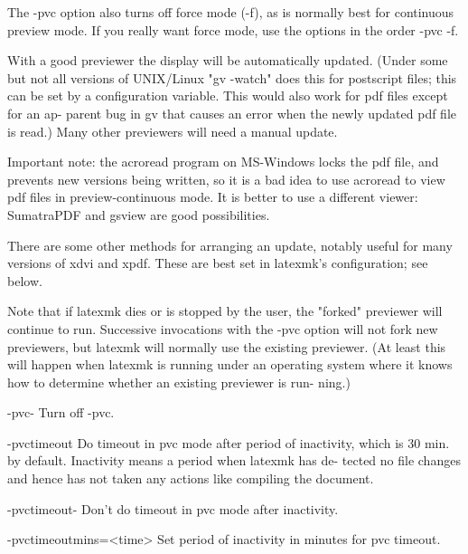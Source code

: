               The -pvc option also turns off force mode (-f), as  is  normally
              best  for  continuous  preview  mode.   If you really want force
              mode, use the options in the order -pvc -f.

              With a good previewer the display will be automatically updated.
              (Under  some but not all versions of UNIX/Linux "gv -watch" does
              this for postscript files; this can be set  by  a  configuration
              variable.   This would also work for pdf files except for an ap-
              parent bug in gv that causes an error when the newly updated pdf
              file is read.)  Many other previewers will need a manual update.

              Important note: the acroread program on MS-Windows locks the pdf
              file, and prevents new versions being written, so it  is  a  bad
              idea  to  use  acroread  to view pdf files in preview-continuous
              mode.  It is better to use a different  viewer:  SumatraPDF  and
              gsview are good possibilities.

              There  are  some  other methods for arranging an update, notably
              useful for many versions of xdvi and xpdf.  These are  best  set
              in latexmk's configuration; see below.

              Note  that  if  latexmk  dies  or  is  stopped  by the user, the
              "forked" previewer will continue to run.  Successive invocations
              with  the  -pvc option will not fork new previewers, but latexmk
              will normally use the existing previewer.  (At least  this  will
              happen  when  latexmk is running under an operating system where
              it knows how to determine whether an existing previewer is  run-
              ning.)


       -pvc-  Turn off -pvc.


       -pvctimeout
              Do  timeout  in pvc mode after period of inactivity, which is 30
              min. by default.  Inactivity means a period when latexmk has de-
              tected  no file changes and hence has not taken any actions like
              compiling the document.


       -pvctimeout-
              Don't do timeout in pvc mode after inactivity.


       -pvctimeoutmins=<time>
              Set period of inactivity in minutes for pvc timeout.



